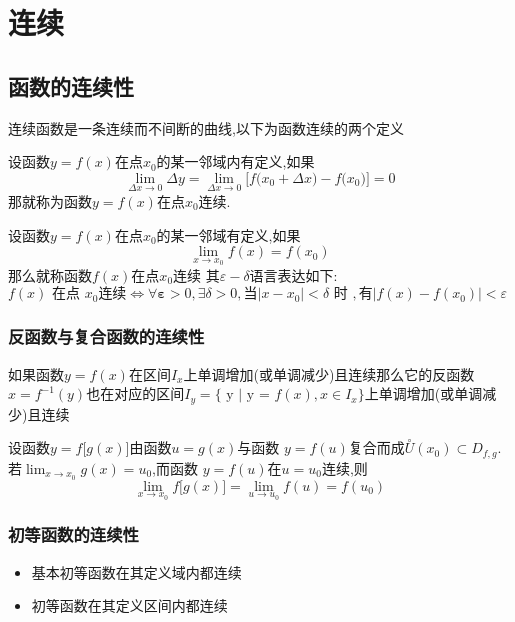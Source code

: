 \documentclass[12pt, a4paper, oneside, UTF8]{ctexbook}
\begin{document}
%  
\else
\fi
\chapter{连续}

\section{函数的连续性}
连续函数是一条连续而不间断的曲线,以下为函数连续的两个定义
\begin{defn}{}{}
    设函数$y=f(x)$在点$x_0$的某一邻域内有定义,如果
    $$
        \lim_{\Delta x\to0}\Delta y=\lim_{\Delta x\to0}\big[f\big(x_{0}+\Delta x\big)-f\big(x_{0}\big)\big]=0
    $$
    那就称为函数$y=f(x)$在点$x_0$连续.
\end{defn}
\begin{defn}{}{}
    设函数$y=f(x)$在点$x_0$的某一邻域有定义,如果
    $$
        \underset{x\to x_0}{\operatorname*{lim}}f(x)=f(x_0)
    $$
    那么就称函数$f(x)$在点$x_0$连续
    其$\varepsilon - \delta $语言表达如下:\\
    $f(x)\text{ 在点 }x_0\text{连续}\Leftrightarrow\forall\boldsymbol{\varepsilon}>0,\exists\delta>0,\text{当}|x-x_0|<\delta\text{ 时 },\text{有}|f(x)-f(x_0)|<\varepsilon $
\end{defn}
\subsection{反函数与复合函数的连续性}
\begin{defn}{}{}
    如果函数$y=f(x)$在区间$I_x$上单调增加(或单调减少)且连续那么它的反函数 $x=f^{-1}(y)$也在对应的区间$I_{y}=\{\text{ y | y = }f(x),x\in I_{x}\}$上单调增加(或单调减少)且连续
\end{defn}
\begin{defn}{}{}
    设函数$y=f\Big[g(x)\Big]$由函数$u=g(x)$与函数 $y=f(u)$复合而成$\stackrel{\circ}{U}(x_0)\subset D_{f,g}$.若$\lim_{x\to x_0}g(x)=u_0$,而函数 $y=f(u)$在$u=u_0$连续,则
    $$\operatorname*{lim}_{x\to x_0}f\Big[g(x)\Big]=\operatorname*{lim}_{u\to u_0}f(u)=f(u_0)$$
\end{defn}
\subsection{初等函数的连续性}
\begin{defn}{}{}
    \begin{itemize}
        \item 基本初等函数在其定义域内都连续
        \item 初等函数在其定义区间内都连续
    \end{itemize}
\end{defn}
\end{document}
